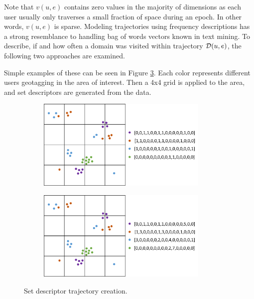 Note that $v(u,e)$ contains zero values in the majority of dimensions as each user usually only traverses a small fraction of space during an epoch. In other words, $v(u,e)$ is sparse.
Modeling trajectories using frequency descriptions has a strong resemblance to handling bag of words vectors known in text mining. To describe, if and how often a domain was visited within trajectory $\mathcal{D}(u,e)$, the following two approaches are examined.

Simple examples of these can be seen in Figure \ref{fig:trajectory_creation}. Each color represents different users geotagging in the area of interest. Then a 4x4 grid is applied to the area, and set descriptors are generated from the data.

\begin{figure}[ph]
	\centering
	\begin{subfigure}[b]{\textwidth}
		\centering
		\includegraphics[width = 0.9\textwidth]{figures/trajectory_bitset}
    \label{fig:trajectory_bitset}
	\end{subfigure}

	\begin{subfigure}[b]{\textwidth}
		\centering
		\includegraphics[width = 0.9\textwidth]{figures/trajectory_frequency}
  	\label{fig:trajectory_frequency}
	\end{subfigure}
  \caption{Set descriptor trajectory creation.}
  \label{fig:trajectory_creation}
	\figSpace
\end{figure}

